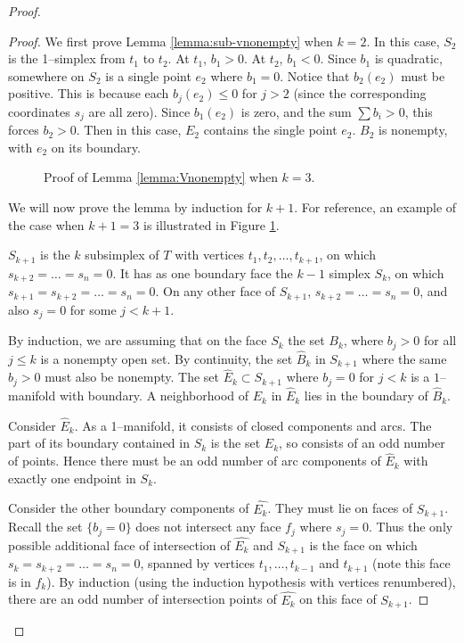 \begin{proof}
\begin{proof}
We first prove Lemma \ref{lemma:sub-vnonempty} when $k=2$.  In this
case, $S_2$ is the 1--simplex from $t_1$ to $t_2$.  At $t_1$, $b_1>0$.
At $t_2$, $b_1 <0$.  Since $b_1$ is quadratic, somewhere on $S_2$ is a
single point $e_2$ where $b_1=0$.  Notice that $b_2(e_2)$ must be
positive.  This is because each $b_j(e_2)\leq 0$ for $j>2$ (since the
corresponding coordinates $s_j$ are all zero).  Since $b_1(e_2)$ is
zero, and the sum $\sum b_i >0$, this forces $b_2>0$.  Then in this
case, $E_2$ contains the single point $e_2$.  $B_2$ is nonempty, with
$e_2$ on its boundary.

\begin{figure}
  
  \caption{Proof of Lemma \ref{lemma:Vnonempty} when $k=3$.}
  \label{fig:findv}
\end{figure}

We will now prove the lemma by induction for $k+1$.  For reference, an
example of the case when $k+1=3$ is illustrated in Figure
\ref{fig:findv}.

$S_{k+1}$ is the $k$ subsimplex of $T$ with vertices $t_1, t_2, \dots,
t_{k+1}$, on which $s_{k+2}= \dots = s_n=0$.  It has as one boundary
face the $k-1$ simplex $S_k$, on which $s_{k+1}= s_{k+2}= \dots
=s_n=0$.  On any other face of $S_{k+1}$, $s_{k+2}=\dots=s_n=0$, and
also $s_j=0$ for some $j<k+1$.

By induction, we are assuming that on the face $S_k$ the set $B_k$,
where $b_j>0$ for all $j\leq k$ is a nonempty open set.  By
continuity, the set $\hat{B}_k$ in $S_{k+1}$ where the same $b_j>0$
must also be nonempty.  %
The set $\hat{E}_k \subset S_{k+1}$ where $b_j=0$ for $j<k$ is a
$1$--manifold with boundary.  A neighborhood of $E_k$ in $\hat{E}_k$
lies in the boundary of $\hat{B}_k$.

Consider $\hat{E}_k$.  As a 1--manifold, it consists of closed
components and arcs.  The part of its boundary contained in $S_k$ is
the set $E_k$, so consists of an odd number of points.  Hence there
must be an odd number of arc components of $\hat{E}_k$ with exactly
one endpoint in $S_k$.

Consider the other boundary components of $\hat{E_k}$.  They must lie
on faces of $S_{k+1}$.  Recall the set $\{b_j=0\}$ does not intersect
any face $f_j$ where $s_j=0$.  Thus the only possible additional face
of intersection of $\hat{E_k}$ and $S_{k+1}$ is the face on which
$s_k=s_{k+2}=\dots=s_n=0$, spanned by vertices $t_1, \dots, t_{k-1}$
and $t_{k+1}$ (note this face is in $f_k$).  By induction (using the
induction hypothesis with vertices renumbered), there are an odd
number of intersection points of $\hat{E_k}$ on this face of
$S_{k+1}$.


\end{proof}
\end{proof}
